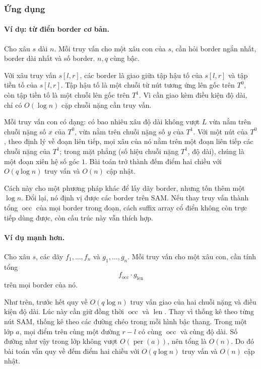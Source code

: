 \documentclass[11pt]{article}
\begin{document}
\subsubsection{Ứng dụng}

\paragraph{Ví dụ: từ điển border cơ bản.}
Cho xâu \(s\) dài \(n\). Mỗi truy vấn cho một xâu con của \(s\), cần hỏi border
ngắn nhất, border dài nhất và số border. \(n,q\) cùng bậc.

Với xâu truy vấn \(s[l,r]\), các border là giao giữa tập hậu tố của \(s[l,r]\)
và tập tiền tố của \(s[l,r]\). Tập hậu tố là một chuỗi từ nút tương ứng lên
gốc trên \(T^0\), còn tập tiền tố là một chuỗi lên gốc trên \(T^1\). Vì cần
giao kèm điều kiện độ dài, chỉ có \(O(\log n)\) cặp chuỗi nặng cần truy vấn.

Mỗi truy vấn con có dạng: có bao nhiêu xâu độ dài không vượt \(L\) vừa nằm
trên chuỗi nặng số \(x\) của \(T^0\), vừa nằm trên chuỗi nặng số \(y\) của
\(T^1\). Với một nút của \(T^0\), theo định lý về đoạn liên tiếp, mọi xâu của
nó nằm trên một đoạn liên tiếp các chuỗi nặng của \(T^1\); trong mặt phẳng
(số hiệu chuỗi nặng \(T^1\), độ dài), chúng là một đoạn xiên hệ số góc \(1\).
Bài toán trở thành đếm điểm hai chiều với \(O(q\log n)\) truy vấn và \(O(n)\)
cập nhật.

Cách này cho một phương pháp khác để lấy dãy border, nhưng tốn thêm một
\(\log n\). Đổi lại, nó định vị được các border trên SAM. Nếu thay truy vấn
thành tổng \(\operatorname{occ}\) của mọi border trong đoạn, cách suffix array
cổ điển không còn trực tiếp dùng được, còn cấu trúc này vẫn thích hợp.

\paragraph{Ví dụ mạnh hơn.}
Cho xâu \(s\), các dãy \(f_1,\ldots,f_n\) và \(g_1,\ldots,g_n\). Mỗi truy vấn
cho một xâu con, cần tính tổng
\[
  f_{\operatorname{occ}}\cdot g_{\operatorname{len}}
\]
trên mọi border của nó.

Như trên, trước hết quy về \(O(q\log n)\) truy vấn giao của hai chuỗi nặng và
điều kiện độ dài. Lúc này cần giữ đồng thời \(\operatorname{occ}\) và
\(\operatorname{len}\). Thay vì thống kê theo từng nút SAM, thống kê theo các
đường chéo trong mỗi hình bậc thang. Trong một lớp \(a\), mọi điểm trên cùng
một đường \(r-l\) có cùng \(\operatorname{occ}\) và cùng độ dài. Số đường như
vậy trong lớp không vượt \(O(\operatorname{per}(a))\), nên tổng là \(O(n)\).
Do đó bài toán vẫn quy về đếm điểm hai chiều với \(O(q\log n)\) truy vấn và
\(O(n)\) cập nhật.
\end{document}
